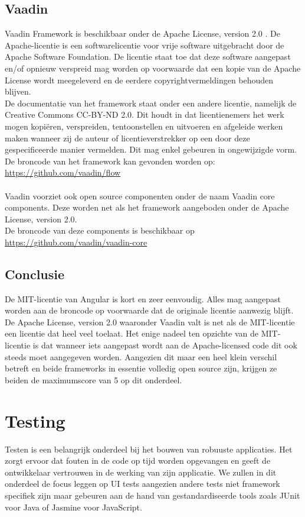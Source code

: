\subsection{Vaadin} \label{Open source Vaadin}
Vaadin Framework is beschikbaar onder de Apache License, version 2.0 \autocite{Apache2019}.
De Apache-licentie is een softwarelicentie voor vrije software uitgebracht door de Apache Software Foundation. De licentie staat toe dat deze software aangepast en/of opnieuw verspreid mag worden op voorwaarde dat een kopie van de Apache License wordt meegeleverd en de eerdere copyrightvermeldingen behouden blijven.
\\ De documentatie van het framework staat onder een andere licentie, namelijk de Creative Commons CC-BY-ND 2.0. Dit houdt in dat licentienemers  het werk mogen  kopiëren, verspreiden, tentoonstellen en uitvoeren en afgeleide werken maken wanneer zij de auteur of licentieverstrekker op een door deze gespecificeerde manier vermelden. Dit mag enkel gebeuren in ongewijzigde vorm.
\\De broncode van het framework kan gevonden worden op: 
\\ \url{https://github.com/vaadin/flow} \\ \\

Vaadin voorziet ook open source componenten onder de naam Vaadin core components. Deze worden net als het framework aangeboden onder de Apache License, version 2.0.
\\ De broncode van deze components is beschikbaar op 
\\ \url{https://github.com/vaadin/vaadin-core }

\subsection{Conclusie}
De MIT-licentie van Angular is kort en zeer eenvoudig. Alles mag aangepast worden aan de broncode op voorwaarde dat de originale licentie aanwezig blijft. 
De Apache License, version 2.0 waaronder Vaadin valt is net als de MIT-licentie een licentie dat heel veel toelaat. Het enige nadeel ten opzichte van de MIT-licentie is dat wanneer iets aangepast wordt aan de Apache-licensed code dit ook steeds moet aangegeven worden.
Aangezien dit maar een heel klein verschil betreft en beide frameworks in essentie volledig open source zijn, krijgen ze beiden de maximumscore van 5 op dit onderdeel.

\section{Testing}
Testen is een belangrijk onderdeel bij het bouwen van robuuste applicaties. Het zorgt ervoor dat fouten in de code op tijd worden opgevangen en geeft de ontwikkelaar vertrouwen in de werking van zijn applicatie. We zullen in dit onderdeel de focus leggen op UI tests aangezien andere tests niet framework specifiek zijn maar gebeuren aan de hand van gestandardiseerde tools zoals JUnit voor Java of Jasmine voor JavaScript.

